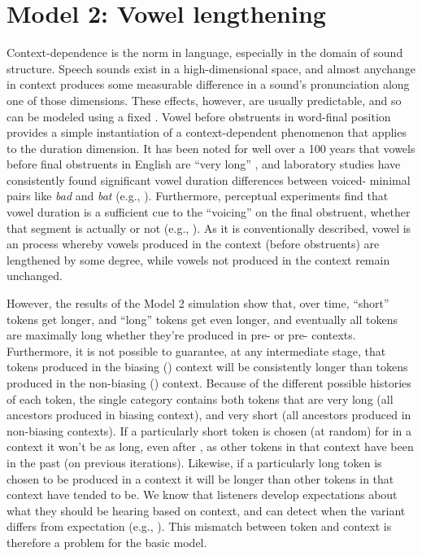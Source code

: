 \section{\label{subsec:Model-2:-Lengthening}Model 2: Vowel lengthening}

Context-dependence is the norm in language, especially in the domain
of sound structure. Speech sounds exist in a high-dimensional space,
and almost any\linebreak change in context produces some measurable difference
in a sound's pronunciation along one of those dimensions. These effects,
however, are usually predictable, and so can be modeled using a fixed
. Vowel  before  obstruents in word-final position
provides a simple instantiation of a context-dependent phenomenon
that applies to the duration dimension. It has been noted for well
over a 100 years that vowels before final  obstruents in English
are “very long” \citep[59]{Sweet1880}, and laboratory
studies have consistently found significant vowel duration differences
between voiced- minimal pairs like \textit{bad} and \textit{bat}
(e.g., \citealt{peterson1960duration,chen1970vowel}). Furthermore,
perceptual experiments find that vowel duration is a sufficient cue
to the “voicing” on the final obstruent, whether that segment
is actually  or not (e.g., \citealt{raphael1972preceding,Klatt1976}).
As it is conventionally described, vowel  is an 
process whereby vowels produced in the  context (before
 obstruents) are lengthened by some degree, while vowels not
produced in the  context remain unchanged.

However, the results of the Model 2 simulation show that, over time,
“short” tokens get longer, and “long” tokens get even
longer, and eventually all tokens are maximally long whether they're
produced in pre- or pre- contexts. Furthermore, it
is not possible to guarantee, at any intermediate stage, that tokens
produced in the biasing () context will be consistently longer
than tokens produced in the non-biasing () context. Because
of the different possible histories of each token, the single category
contains both tokens that are very long (all ancestors produced in
biasing context), and very short (all ancestors produced in non-biasing
contexts). If a particularly short token is chosen (at random) for
 in a  context it won't be as long, even after ,
as other tokens in that context have been in the past (on previous
iterations). Likewise, if a particularly long token is chosen to be
produced in a  context it will be longer than other tokens
in that context have tended to be. We know that listeners develop
expectations about what they should be hearing based on context, and
can detect when the variant differs from expectation (e.g., \citealp{krakow1988coarticulatory,gaskell1996phonological}).
This mismatch between token and context is therefore a problem for
the basic  model. 

